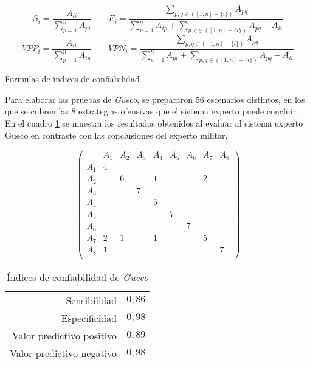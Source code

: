 \begin{table}[H]
  \begin{center}
    $$
    S_i = \displaystyle\frac{A_{ii}}{\displaystyle\sum_{p=1}^nA_{pi}} \qquad
    E_i = \displaystyle\frac{\displaystyle\sum_{p,q \in ([1,n]-\{i\})}A_{pq}}{\displaystyle\sum_{p=1}^nA_{ip} + \displaystyle\sum_{p,q \in ([1,n]-\{i\})}A_{pq} - A_{ii}}
    $$
    $$
    VPP_i = \displaystyle\frac{A_{ii}}{\displaystyle\sum_{p=1}^nA_{ip}} \qquad
    VPN_i = \displaystyle\frac{\displaystyle\sum_{p,q \in ([1,n]-\{i\})}A_{pq}}{\displaystyle\sum_{p=1}^nA_{pi} + \displaystyle\sum_{p,q \in ([1,n]-\{i\})}A_{pq} - A_{ii}}
    $$
    \caption{Formulas de índices de confiabilidad}
    \label{cuadro:indicesdeconfibialidad}
  \end{center}
\end{table}

Para elaborar las pruebas de \emph{Gueco}, se prepararon 56 escenarios distintos, en los que se cubren las 8 estrategias ofensivas que el sistema experto puede concluir. En el cuadro \ref{cuadro:indicesdegueco} se muestra los resultados obtenidos al evaluar al sistema experto Gueco en contraste con las conclusiones del experto militar.

\begin{table}[H]
  \begin{center}
    $$
    \left(\begin{array}{c|cccccccc}
          & A_1 & A_2 & A_3 & A_4 & A_5 & A_6 & A_7 & A_8\\\hline
      A_1 &  4  &     &     &     &     &     &     &   \\
      A_2 &     &  6  &     &  1  &     &     &  2  &   \\
      A_3 &     &     &  7  &     &     &     &     &   \\
      A_4 &     &     &     &  5  &     &     &     &   \\
      A_5 &     &     &     &     &  7  &     &     &   \\
      A_6 &     &     &     &     &     &  7  &     &   \\
      A_7 &  2  &  1  &     &  1  &     &     &  5  &   \\
      A_8 &  1  &     &     &     &     &     &     &  7\\
    \end{array}\right)
    $$

    \begin{tabular}{r@{ = }c}
      Sensibilidad & $0,86$\\
      Especificidad & $0,98$\\
      Valor predictivo positivo & $0,89$\\
      Valor predictivo negativo & $0,98$\\
    \end{tabular}
    \caption{Índices de confiabilidad de \emph{Gueco}}
    \label{cuadro:indicesdegueco}
  \end{center}
\end{table}


